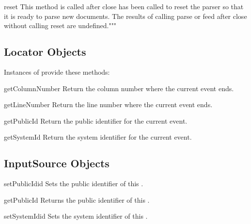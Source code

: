 \begin{methoddesc}[IncrementalParser]{reset}{}
  This method is called after close has been called to reset the
  parser so that it is ready to parse new documents. The results of
  calling parse or feed after close without calling reset are
  undefined."""
\end{methoddesc}


\subsection{Locator Objects \label{locator-objects}}

Instances of  provide these methods:

\begin{methoddesc}[Locator]{getColumnNumber}{}
  Return the column number where the current event ends.
\end{methoddesc}

\begin{methoddesc}[Locator]{getLineNumber}{}
  Return the line number where the current event ends.
\end{methoddesc}

\begin{methoddesc}[Locator]{getPublicId}{}
  Return the public identifier for the current event.
\end{methoddesc}

\begin{methoddesc}[Locator]{getSystemId}{}
  Return the system identifier for the current event.
\end{methoddesc}


\subsection{InputSource Objects \label{input-source-objects}}

\begin{methoddesc}[InputSource]{setPublicId}{id}
  Sets the public identifier of this .
\end{methoddesc}

\begin{methoddesc}[InputSource]{getPublicId}{}
  Returns the public identifier of this .
\end{methoddesc}

\begin{methoddesc}[InputSource]{setSystemId}{id}
  Sets the system identifier of this .
\end{methoddesc}

